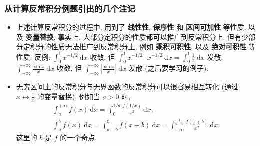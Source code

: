 \begin{frame}
\frametitle{从计算反常积分例题引出的几个注记}

\begin{remark}
\begin{itemize}
\item 上述计算反常积分的过程中, 用到了 \textbf{线性性}, \textbf{保序性} 和 \textbf{区间可加性} 等性质, 以及 \textbf{变量替换}. 事实上, 大部分定积分的性质都可以推广到反常积分上. 但有少部分定积分的性质无法推广到反常积分上, 例如 \textbf{乘积可积性}, 以及 \textbf{绝对可积性} 等性质. 反例: $\int_0^1 x^{-1/2} ~ \mathrm{d} x$ 收敛, 但 $\int_0^1 x^{-1/2} \cdot x^{-1/2} ~ \mathrm{d} x = \int_0^1 \frac{1}{x} ~ \mathrm{d} x$ 发散; $\int_{-\infty}^{+\infty} \frac{\sin x}{x} ~ \mathrm{d} x$ 收敛, 但 $\int_{-\infty}^{+\infty} \left|\frac{\sin x}{x}\right| ~ \mathrm{d} x$ 发散 (之后要学习的例子).
\item 无穷区间上的反常积分与无界函数的反常积分可以很容易相互转化 (通过 $x \leftrightarrow \frac{1}{x}$ 的变量替换), 例如当 $a > 0$ 时,
\begin{gather*}
\int_a^{+\infty} f(x) ~ \mathrm{d} x = \int_0^{1/a} \frac{f(1/x)}{x^2} ~ \mathrm{d} x, \\
\int_a^b f(x) ~ \mathrm{d} x = \int_{a-b}^0 f(x + b) ~ \mathrm{d} x = \int_{-\infty}^{\frac{1}{a-b}} \frac{f\left(\frac{1}{x} + b\right)}{x^2} ~ \mathrm{d} x.
\end{gather*}
这里的 $b$ 是 $f$ 的一个奇点.
\end{itemize}
\end{remark}

\end{frame}


